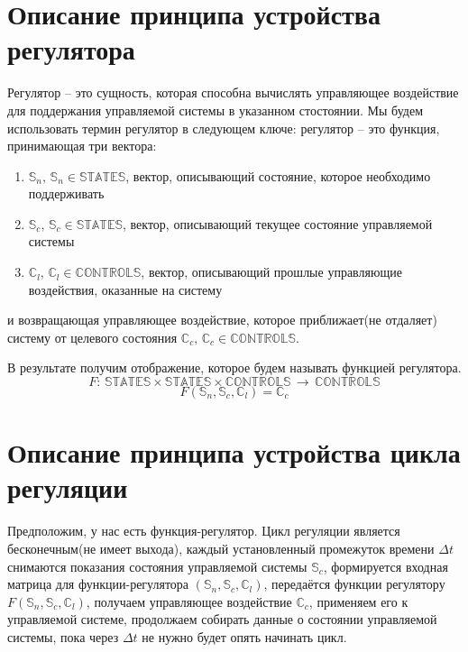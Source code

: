 \documentclass[14pt]{extreport}
\begin{document}
        \section{Описание принципа устройства регулятора}
            Регулятор -- это сущность, которая способна вычислять управляющее воздействие для поддержания управляемой системы в указанном стостоянии.
            Мы будем использовать термин регулятор в следующем ключе: регулятор -- это функция, принимающая три вектора:
            {
                \begin{enumerate}
                      \item \(\mathbb{S}_n,\, \mathbb{S}_n \in \mathbb{STATES}\),
                        вектор, описывающий состояние, которое необходимо поддерживать
                      \item \(\mathbb{S}_c,\, \mathbb{S}_c \in \mathbb{STATES}\),
                        вектор, описывающий текущее состояние управляемой системы
                      \item \(\mathbb{C}_l,\, \mathbb{C}_l \in \mathbb{CONTROLS}\),
                        вектор, описывающий прошлые управляющие воздействия, оказанные на систему
                \end{enumerate}
            }
            и возвращающая управляющее воздействие, которое приближает(не отдаляет) систему от целевого состояния \(\mathbb{C}_c,\, \mathbb{C}_c \in \mathbb{CONTROLS}\).

            В результате получим отображение, которое будем называть функцией регулятора.
            \[F:\,\mathbb{STATES}\times\mathbb{STATES}\times\mathbb{CONTROLS}\,\rightarrow\,\mathbb{CONTROLS}\]
            \[F(\mathbb{S}_n,\mathbb{S}_c,\mathbb{C}_l) = \mathbb{C}_c\]

        \section{Описание принципа устройства цикла регуляции}
            Предположим, у нас есть функция-регулятор. Цикл регуляции является бесконечным(не имеет выхода), каждый установленный промежуток времени $\Delta t$ снимаются показания состояния управляемой системы $\mathbb{S}_c$, формируется входная матрица для функции-регулятора $(\mathbb{S}_n,\mathbb{S}_c,\mathbb{C}_l)$, передаётся функции регулятору $F(\mathbb{S}_n,\mathbb{S}_c,\mathbb{C}_l)$, получаем управляющее воздействие $ \mathbb{C}_c$, применяем его к управляемой системе, продолжаем собирать данные о состоянии управляемой системы, пока через $\Delta t$ не нужно будет опять начинать цикл.
\end{document}
